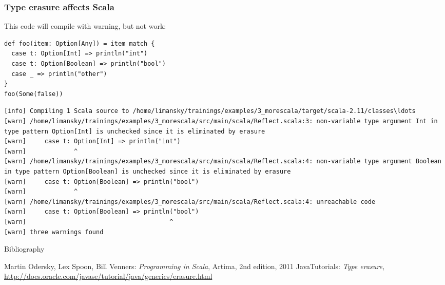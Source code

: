 \documentclass{beamer}
\begin{document}
\begin{frame}[fragile]
\frametitle{Type erasure affects Scala}
This code will compile with warning, but not work:
\begin{lstlisting}
def foo(item: Option[Any]) = item match {
  case t: Option[Int] => println("int")
  case t: Option[Boolean] => println("bool")
  case _ => println("other")
}
foo(Some(false))
\end{lstlisting}
\begin{lstlisting}
[info] Compiling 1 Scala source to /home/limansky/trainings/examples/3_morescala/target/scala-2.11/classes\ldots
[warn] /home/limansky/trainings/examples/3_morescala/src/main/scala/Reflect.scala:3: non-variable type argument Int in type pattern Option[Int] is unchecked since it is eliminated by erasure
[warn]     case t: Option[Int] => println("int")
[warn]             ^
[warn] /home/limansky/trainings/examples/3_morescala/src/main/scala/Reflect.scala:4: non-variable type argument Boolean in type pattern Option[Boolean] is unchecked since it is eliminated by erasure
[warn]     case t: Option[Boolean] => println("bool")
[warn]             ^
[warn] /home/limansky/trainings/examples/3_morescala/src/main/scala/Reflect.scala:4: unreachable code
[warn]     case t: Option[Boolean] => println("bool")
[warn]                                       ^
[warn] three warnings found
\end{lstlisting}
\end{frame}

\begin{frame}{Bibliography}
\begin{thebibliography}{00}
Martin Odersky, Lex Spoon, Bill Venners:
\emph{Programming in Scala},
Artima, 2nd edition, 2011
Java\texttrademark  Tutorials: \emph{Type erasure}, \url{http://docs.oracle.com/javase/tutorial/java/generics/erasure.html}
\end{thebibliography}
\end{frame}


\end{document}
